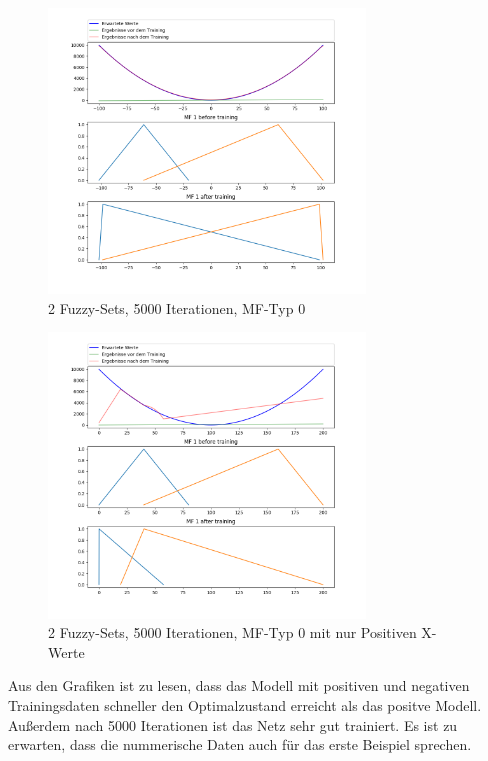 \begin{figure}[htbp]
	\centering
	\includegraphics[width=0.75\textwidth]{images/parabola_1000/Mini-Batch/parabola_1000 1 Input 2 Sets 5000 Epochs Mini-Batch Gradient Descent two equations mf.png}
	\caption{2 Fuzzy-Sets, 5000 Iterationen, MF-Typ 0}
\end{figure}
\begin{figure}[htbp]
	\centering
	\includegraphics[width=0.75\textwidth]{images/parabola_positive/Mini-Batch/parabola_positive 1 Input 2 Sets 5000 Epochs Mini-Batch Gradient Descent two equations mf.png}
	\caption{2 Fuzzy-Sets, 5000 Iterationen, MF-Typ 0 mit nur Positiven X-Werte}
\end{figure}

Aus den Grafiken ist zu lesen, dass das Modell mit positiven und negativen Trainingsdaten schneller den Optimalzustand erreicht als das positve Modell. Außerdem nach 5000 Iterationen ist das Netz sehr gut trainiert. Es ist zu erwarten, dass die nummerische Daten auch für das erste Beispiel sprechen.

